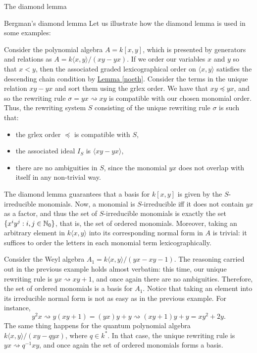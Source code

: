 \begin{chapter}{The diamond lemma}
\begin{section}{Bergman's diamond lemma}
Let us illustrate how the diamond lemma is used in some examples:

\begin{exmp} Consider the polynomial algebra $A=k[x,y]$, which is presented by generators and relations as $A=k\langle x,y\rangle/(xy-yx)$. If we order our variables $x$ and $y$ so that $x<y$, then the associated graded lexicographical order on $\langle x,y\rangle$ satisfies the descending chain condition by \hyperref[noeth]{Lemma \ref*{noeth}}. Consider the terms in the unique relation $xy-yx$ and sort them using the grlex order. We have that $xy\preceq yx$, and so the rewriting rule $\sigma=yx\rightsquigarrow xy$ is compatible with our chosen monomial order. Thus, the rewriting system $S$ consisting of the unique rewriting rule $\sigma$ is such that:
\begin{itemize}
\item the grlex order $\preceq$ is compatible with $S$,
\item the associated ideal $I_S$ is $\langle xy-yx\rangle$,
\item there are no ambiguities in $S$, since the monomial $yx$ does not overlap with itself in any non-trivial way.
\end{itemize}
The diamond lemma guarantees that a basis for $k[x,y]$ is given by the $S$-irreducible monomials. Now, a monomial is $S$-irreducible iff it does not contain $yx$ as a factor, and thus the set of $S$-irreducible monomials is exactly the set $\{x^iy^j:i,j\in\mathbb{N}_0\}$, that is, the set of ordered monomials.
Moreover, taking an arbitrary element in $k\langle x,y\rangle$ into its corresponding normal form in $A$ is trivial: it suffices to order the letters in each monomial term lexicographically.
\end{exmp}
\begin{exmp} Consider the Weyl algebra $A_1 = k\langle x,y\rangle/(yx-xy-1)$. The reasoning carried out in the previous example holds almost verbatim: this time, our unique rewriting rule is $yx\rightsquigarrow xy + 1$, and once again there are no ambiguities. Therefore, the set of ordered monomials is a basis for $A_1$. Notice that taking an element into its irreducible normal form is not as easy as in the previous example. For instance, 
\[y^2x\rightsquigarrow y(xy+1) = (yx)y +y \rightsquigarrow (xy+1)y + y =xy^2 +2y.\]
The same thing happens for the quantum polynomial algebra $k\langle x,y\rangle/(xy-qyx)$, where $q\in k^*$. In that case, the unique rewriting rule is $yx\rightsquigarrow q^{-1}xy$, and once again the set of ordered monomials forms a basis.

\end{exmp}
\end{section}
\end{chapter}
